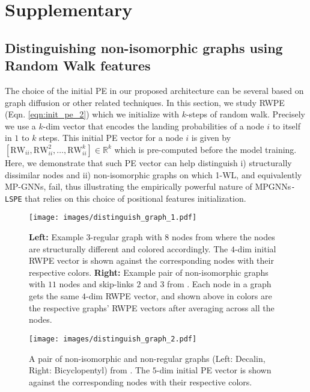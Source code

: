 \documentclass{article} \usepackage{iclr2021_conference,times}
\begin{document}



\newpage
\appendix
\section{Supplementary}
\label{sec:supplementary}

\subsection{Distinguishing non-isomorphic graphs using Random Walk features}
\label{sec:supplementary_power}

The choice of the initial PE in our proposed architecture can be several based on graph diffusion or other related techniques. In this section, we study RWPE (Eqn. \ref{eqn:init_pe_2}) which we initialize with $k$-steps of random walk. Precisely we use a $k$-dim vector that encodes the landing probabilities of a node $i$ to itself in $1$ to $k$ steps. This initial PE vector for a node $i$ is given by $[\text{RW}_{ii}, \text{RW}^2_{ii}, \ldots, \text{RW}^k_{ii}] \in \mathbb{R}^{k}$ which is pre-computed before the model training. Here, we demonstrate that such PE vector can help distinguish i) structurally dissimilar nodes and ii) non-isomorphic graphs on which 1-WL, and equivalently MP-GNNs, fail, thus illustrating the empirically powerful nature of MPGNNs\texttt{-LSPE} that relies on this choice of positional features initialization.

\begin{figure}[h]
\texttt{[image: images/distinguish\_graph\_1.pdf]}
\caption{\textbf{Left:} Example $3$-regular graph with $8$ nodes from \cite{li2020distance} where the nodes are structurally different and colored accordingly. The $4$-dim initial RWPE vector is shown against the corresponding nodes with their respective colors. \textbf{Right:} Example pair of non-isomorphic graphs with $11$ nodes and skip-links $2$ and $3$ from \cite{murphy2019relational}. Each node in a graph gets the same $4$-dim RWPE vector, and shown above in colors are the respective graphs' RWPE vectors after averaging across all the nodes.}
\label{fig:distinguish_nodes_1}
\end{figure}

\begin{figure}[h]
\centering
\texttt{[image: images/distinguish\_graph\_2.pdf]}
\caption{A pair of non-isomorphic and non-regular graphs (Left: Decalin, Right: Bicyclopentyl) from \cite{sato2020survey}. The $5$-dim initial PE vector is shown against the corresponding nodes with their respective colors.}
\label{fig:distinguish_nodes_2}
\end{figure}
\end{document}
